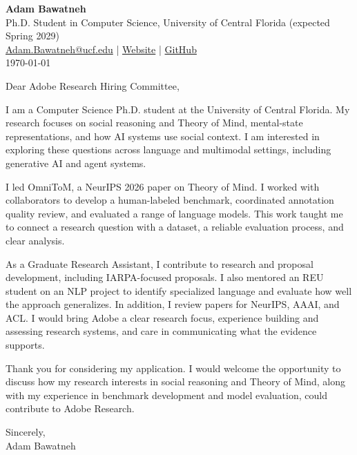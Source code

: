 \documentclass[11pt]{article}
\begin{document}
\textbf{Adam Bawatneh}\\
Ph.D. Student in Computer Science, University of Central Florida (expected Spring 2029)\\
\href{mailto:Adam.Bawatneh@ucf.edu}{Adam.Bawatneh@ucf.edu} \;|\;
\href{https://adam-12-0.github.io/}{Website} \;|\;
\href{https://github.com/Adam-12-0}{GitHub}\\[1em]
\today

\vspace{0.5em}
Dear Adobe Research Hiring Committee,

I am a Computer Science Ph.D. student at the University of Central Florida. My research focuses on social reasoning and Theory of Mind, mental-state representations, and how AI systems use social context. I am interested in exploring these questions across language and multimodal settings, including generative AI and agent systems.

I led OmniToM, a NeurIPS 2026 paper on Theory of Mind. I worked with collaborators to develop a human-labeled benchmark, coordinated annotation quality review, and evaluated a range of language models. This work taught me to connect a research question with a dataset, a reliable evaluation process, and clear analysis.

As a Graduate Research Assistant, I contribute to research and proposal development, including IARPA-focused proposals. I also mentored an REU student on an NLP project to identify specialized language and evaluate how well the approach generalizes. In addition, I review papers for NeurIPS, AAAI, and ACL. I would bring Adobe a clear research focus, experience building and assessing research systems, and care in communicating what the evidence supports.

Thank you for considering my application. I would welcome the opportunity to discuss how my research interests in social reasoning and Theory of Mind, along with my experience in benchmark development and model evaluation, could contribute to Adobe Research.

Sincerely,\\[0.5em]
Adam Bawatneh
\end{document}
